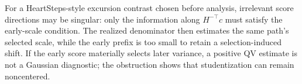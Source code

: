 For a HeartSteps-style excursion contrast chosen before analysis, irrelevant score directions may be singular: only the information along \(H^{-\top}c\) must satisfy the early-scale condition. The realized denominator then estimates the same path's selected scale, while the early prefix is too small to retain a selection-induced shift. If the early score materially selects later variance, a positive QV estimate is not a Gaussian diagnostic; the obstruction shows that studentization can remain noncentered.